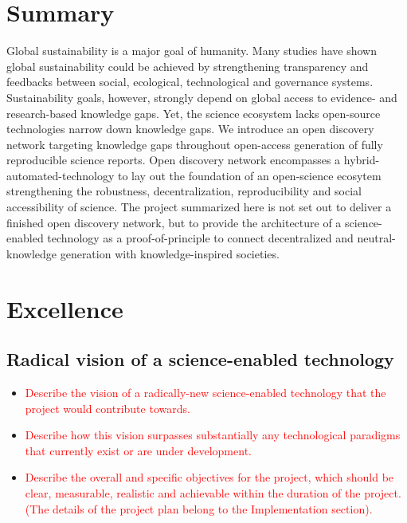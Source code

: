 \documentclass[12pt, a4paper]{article} %
\begin{document}
\section*{{\bf Summary}} Global sustainability is a
  major goal of humanity. Many studies have shown global
  sustainability could be achieved by strengthening transparency and
  feedbacks between social, ecological, technological and governance
  systems. Sustainability goals, however, strongly depend on global
  access to evidence- and research-based knowledge gaps. Yet, the
  science ecosystem lacks open-source technologies narrow down
  knowledge gaps. We introduce an open discovery network targeting
  knowledge gaps throughout open-access generation of fully
  reproducible science reports. Open discovery network encompasses a
  hybrid-automated-technology to lay out the foundation of an
  open-science ecosytem strengthening the robustness,
  decentralization, reproducibility and social accessibility of
  science. The project summarized here is not set out to deliver a
  finished open discovery network, but to provide the architecture of
  a science-enabled technology as a proof-of-principle to connect
  decentralized and neutral-knowledge generation with
  knowledge-inspired societies.
\section{Excellence}
\subsection{Radical vision of a science-enabled technology}

\begin{itemize}
\item \textcolor{red}{Describe the vision of a radically-new science-enabled
  technology that the project would contribute towards.}
\item \textcolor{red}{Describe how this vision surpasses substantially
    any technological paradigms that currently exist or are under
    development.}
\item \textcolor{red}{Describe the overall and specific objectives for
    the project, which should be clear, measurable, realistic and
    achievable within the duration of the project. (The details of the
    project plan belong to the Implementation section).}
\end{itemize}
\end{document}
